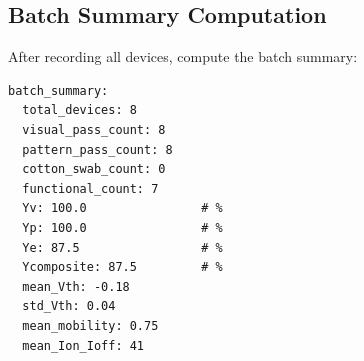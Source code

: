 \documentclass[11pt,a4paper]{article}
\begin{document}
\subsection{Batch Summary Computation}

After recording all devices, compute the batch summary:

\begin{verbatim}
batch_summary:
  total_devices: 8
  visual_pass_count: 8
  pattern_pass_count: 8
  cotton_swab_count: 0
  functional_count: 7
  Yv: 100.0                # %
  Yp: 100.0                # %
  Ye: 87.5                 # %
  Ycomposite: 87.5         # %
  mean_Vth: -0.18
  std_Vth: 0.04
  mean_mobility: 0.75
  mean_Ion_Ioff: 41
\end{verbatim}
\end{document}
